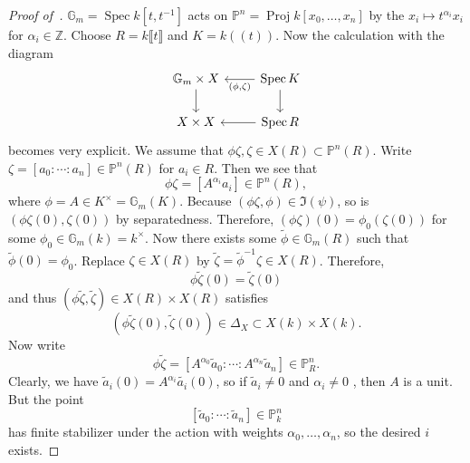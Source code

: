 \documentclass{amsart}
\theoremstyle{definition}
\theoremstyle{remark}
\theoremstyle{plain}
\theoremstyle{definition}
\theoremstyle{remark}
\newcommand{\G}{\mathbb{G}}
\newcommand{\Z}{\mathbb{Z}}
\renewcommand{\P}{\mathbb{P}}
\newcommand{\1}{\mathbf{1}}
\newcommand{\2}{\mathbf{2}}
\newcommand{\3}{\mathbf{3}}
\newcommand{\ps}[1]{\lBrack #1 \rBrack}
\newcommand{\ls}[1]{(\!( #1 )\!)}
\DeclareMathOperator{\Spec}{Spec}
\DeclareMathOperator{\Proj}{Proj}
\begin{document}
\begin{proof}[Proof of~]
    \(\G_m = \Spec k[t,t^{-1}]\) acts on \(\P^n = \Proj k[x_0, \ldots, x_n]\) by the \(x_i \mapsto t^{\alpha_i} x_i\) for \(\alpha_i \in \Z\). Choose \(R = k\ps{t}\) and \(K = k\ls{t}\). Now the calculation with the diagram
    \begin{equation*}
    \begin{tikzcd}
        \G_m \times X \ar{d} & \Spec K \ar{l}{(\phi, \zeta)} \ar{d} \\
        X \times X & \Spec R \ar{l}
    \end{tikzcd}
    \end{equation*}
    becomes very explicit. We assume that \(\phi \zeta, \zeta \in X(R) \subset \P^n(R)\). Write \(\zeta = [a_0 : \cdots : a_n] \in \P^n(R)\) for \(a_i \in R\). Then we see that
    \[ \phi \zeta = [A^{\alpha_i} a_i] \in \P^n(R), \]
    where \(\phi = A \in K^{\times} = \G_m(K)\). Because \((\phi \zeta, \phi) \in \Im(\psi)\), so is \((\phi \zeta (0), \zeta(0))\) by separatedness. Therefore, \((\phi \zeta)(0) = \phi_0 (\zeta(0))\) for some \(\phi_0 \in \G_m(k) = k^{\times}\). Now there exists some \(\tilde{\phi} \in \G_m(R)\) such that \(\tilde{\phi}(0) = \phi_0\). Replace \(\zeta \in X(R)\) by \(\tilde{\zeta} = \tilde{\phi}^{-1} \zeta \in X(R)\). Therefore, 
    \[ \phi \tilde{\zeta}(0) = \tilde{\zeta}(0) \]
    and thus \((\phi \tilde{\zeta}, \tilde{\zeta}) \in X(R) \times X(R)\) satisfies
    \[ (\phi \tilde{\zeta}(0), \tilde{\zeta}(0)) \in \Delta_X \subset X(k) \times X(k). \]
    Now write
    \[ \phi \tilde{\zeta} = [A^{\alpha_0} \tilde{a}_0 : \cdots : A^{\alpha_n} \tilde{a}_n] \in \P^n_R. \]
    Clearly, we have \(\tilde{a}_i(0) = A^{\alpha_i} \tilde{a_i}(0)\), so if \(\tilde{a}_i \neq 0\) and \(\alpha_i \neq 0\) , then \(A\) is a unit. But  the point
    \[ [\tilde{a}_0 : \cdots : \tilde{a}_n] \in \P^n_k \]
    has finite stabilizer under the action with weights \(\alpha_0, \ldots, \alpha_n\), so the desired \(i\) exists.
\end{proof}
\end{document}
